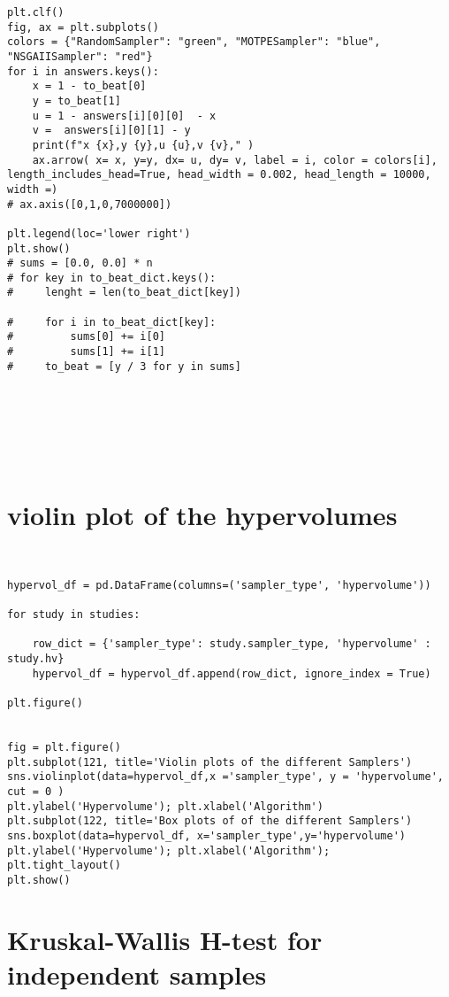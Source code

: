 \documentclass[11pt]{article}
\begin{document}
\begin{verbatim}
plt.clf()
fig, ax = plt.subplots()
colors = {"RandomSampler": "green", "MOTPESampler": "blue", "NSGAIISampler": "red"}
for i in answers.keys():
    x = 1 - to_beat[0]
    y = to_beat[1]
    u = 1 - answers[i][0][0]  - x
    v =  answers[i][0][1] - y
    print(f"x {x},y {y},u {u},v {v}," )
    ax.arrow( x= x, y=y, dx= u, dy= v, label = i, color = colors[i], length_includes_head=True, head_width = 0.002, head_length = 10000, width =)
# ax.axis([0,1,0,7000000])

plt.legend(loc='lower right')
plt.show()
# sums = [0.0, 0.0] * n
# for key in to_beat_dict.keys():
#     lenght = len(to_beat_dict[key])

#     for i in to_beat_dict[key]:
#         sums[0] += i[0]
#         sums[1] += i[1]
#     to_beat = [y / 3 for y in sums]







\end{verbatim}

\section{violin plot of the hypervolumes}
\label{sec:org57079aa}

\begin{verbatim}


hypervol_df = pd.DataFrame(columns=('sampler_type', 'hypervolume'))

for study in studies:

    row_dict = {'sampler_type': study.sampler_type, 'hypervolume' : study.hv}
    hypervol_df = hypervol_df.append(row_dict, ignore_index = True)

plt.figure()


fig = plt.figure()
plt.subplot(121, title='Violin plots of the different Samplers')
sns.violinplot(data=hypervol_df,x ='sampler_type', y = 'hypervolume', cut = 0 )
plt.ylabel('Hypervolume'); plt.xlabel('Algorithm')
plt.subplot(122, title='Box plots of of the different Samplers')
sns.boxplot(data=hypervol_df, x='sampler_type',y='hypervolume')
plt.ylabel('Hypervolume'); plt.xlabel('Algorithm');
plt.tight_layout()
plt.show()

\end{verbatim}

\section{Kruskal-Wallis H-test for independent samples}
\label{sec:org310d771}
\end{document}
